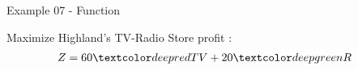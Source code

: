 \begin{frame}{Example 07 - Function}

Maximize Highland's TV-Radio Store profit :
\begin{align*}
    Z &= 60\colora{TV} + 20\colorb{R}
\end{align*}

\end{frame}
